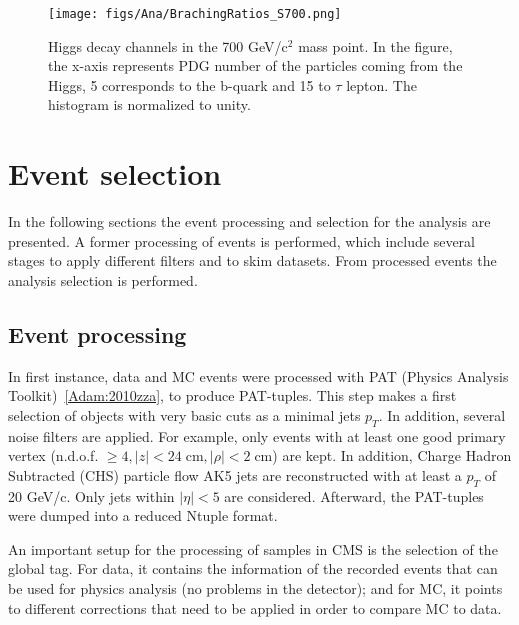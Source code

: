 \begin{figure}[!Hhtbp]
  \begin{center}
    \texttt{[image: figs/Ana/BrachingRatios\_S700.png]}
    \caption{Higgs decay channels in the 700 GeV/$\text{c}^{2}$ mass point. In the figure, the x-axis represents PDG number of the particles coming from the Higgs, 5 corresponds to the b-quark and 15 to $\tau$ lepton. The histogram is normalized to unity.}
    \label{fig:BR_Higgs_SignalSamples}
  \end{center}
\end{figure}


\section{Event selection}
\label{sec:sel}

In the following sections the event processing and selection for the analysis are presented. A former processing of events is performed, which include several stages to apply different filters and to skim datasets. From processed events the analysis selection is performed.

\subsection{Event processing}

In first instance, data and MC events were processed with PAT (Physics Analysis Toolkit)~\ref{Adam:2010zza}, to produce PAT-tuples. This step makes a first selection of objects with very basic cuts as a minimal jets $p_{T}$. In addition, several noise filters are applied. For example, only events with at least one good primary vertex (n.d.o.f. $\ge 4, |z|<24 \;\text{cm}, |\rho|< 2 \;\text{cm}$) are kept. In addition, Charge Hadron Subtracted (CHS) particle flow AK5 jets are reconstructed with at least a $p_{T}$ of 20 GeV/c. Only jets within $|\eta|<5$ are considered. Afterward, the PAT-tuples were dumped into a reduced Ntuple format. 

An important setup for the processing of samples in CMS is the selection of the global tag. For data, it contains the information of the recorded events that can be used for physics analysis (no problems in the detector); and for MC, it points to different corrections that need to be applied in order to compare MC to data.

